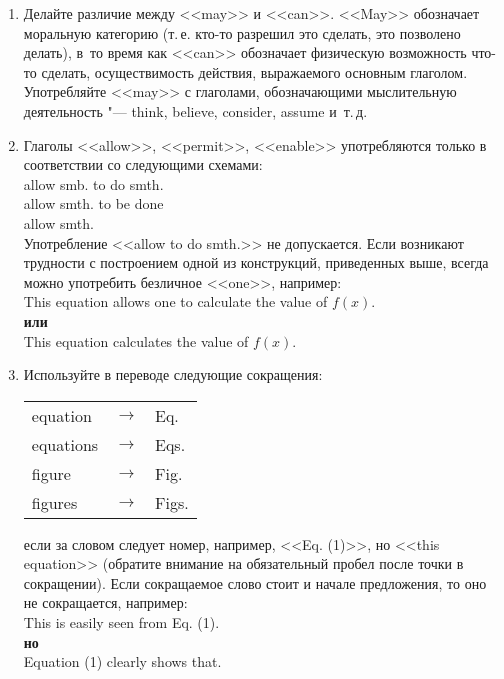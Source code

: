 \documentclass[a5paper, 10pt, twoside, numbers=enddot]{scrartcl}
\newcommand{\etc}{и~т.\,д.\xspace}
\newcommand{\ie}{т.\,е.\xspace}
\begin{document}
\begin{enumerate}
  \item Делайте различие между <<may>> и <<can>>. <<May>> обозначает моральную категорию (\ie кто-то
    разрешил это сделать, это позволено делать), в~то время как <<can>> обозначает физическую
    возможность что-то сделать, осу\-ществимость действия, выражаемого основным глаголом. Употребляйте
    <<may>> с глаголами, обозначающими мыслительную деятельность "--- think, believe, consider,
    assume \etc

  \item Глаголы <<allow>>, <<permit>>, <<enable>> употребляются только в соответствии со следующими
    схемами:\\ [4pt] \textsf{
      allow smb. to do smth.\\
      allow smth. to be done\\
      allow smth.\\ [4pt]}
    Употребление <<allow to do smth.>> не допускается. Если возникают трудности с построением одной
    из конструкций, приведенных выше, всегда можно употребить безличное <<one>>, например:\\ [4pt]
    \textsf{
      This equation allows one to calculate the value of $f(x)$.\\ [4pt]
      \textbf{или}\\ [4pt]
      This equation calculates the value of $f(x)$.
    }

  \item Используйте в переводе следующие сокращения:
    \begin{center}
      \sffamily
      \begin{tabular}{lll}
        equation  & $\rightarrow$ & Eq.\\
        equations & $\rightarrow$ & Eqs.\\
        figure    & $\rightarrow$ & Fig.\\
        figures   & $\rightarrow$ & Figs.\\
      \end{tabular}
    \end{center}
    если за словом следует номер, например, <<Eq. (1)>>, но <<this equation>> (обратите внимание на
    обязательный пробел после точки в сокращении). Если сокращаемое слово стоит и начале предложения,
    то оно не сокращается, например:\\ [4pt]
    \textsf{
      This is easily seen from Eq. (1).\\ [4pt]
      \textbf{но}\\ [4pt]
      Equation (1) clearly shows that.
    }


\end{enumerate}
\end{document}
